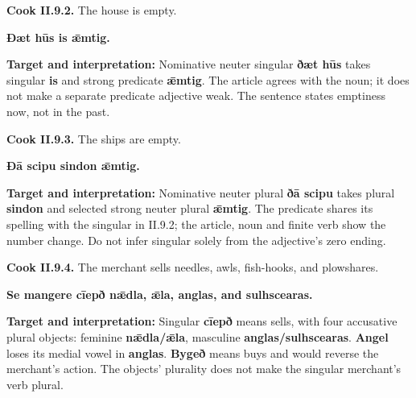 \par\begin{minipage}{\linewidth}\raggedright
\textbf{Cook II.9.2.} The house is empty.

\textbf{Ðæt hūs is ǣmtig.}

\textbf{Target and interpretation:} Nominative neuter singular \textbf{ðæt hūs} takes singular \textbf{is} and strong predicate \textbf{ǣmtig}. The article agrees with the noun; it does not make a separate predicate adjective weak. The sentence states emptiness now, not in the past.

\end{minipage}\par\addvspace{4pt}

\par\begin{minipage}{\linewidth}\raggedright
\textbf{Cook II.9.3.} The ships are empty.

\textbf{Ðā scipu sindon ǣmtig.}

\textbf{Target and interpretation:} Nominative neuter plural \textbf{ðā scipu} takes plural \textbf{sindon} and selected strong neuter plural \textbf{ǣmtig}. The predicate shares its spelling with the singular in II.9.2; the article, noun and finite verb show the number change. Do not infer singular solely from the adjective's zero ending.

\end{minipage}\par\addvspace{4pt}

\par\begin{minipage}{\linewidth}\raggedright
\textbf{Cook II.9.4.} The merchant sells needles, awls, fish-hooks, and plowshares.

\textbf{Se mangere cīepð nǣdla, ǣla, anglas, and sulhscearas.}

\textbf{Target and interpretation:} Singular \textbf{cīepð} means sells, with four accusative plural objects: feminine \textbf{nǣdla/\allowbreak{}ǣla}, masculine \textbf{anglas/\allowbreak{}sulhscearas}. \textbf{Angel} loses its medial vowel in \textbf{anglas}. \textbf{Bygeð} means buys and would reverse the merchant's action. The objects' plurality does not make the singular merchant's verb plural.

\end{minipage}\par\addvspace{4pt}

